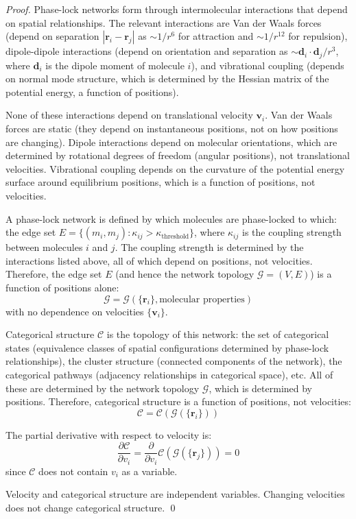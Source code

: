 \documentclass[12pt,a4paper]{article}
\theoremstyle{definition}
\theoremstyle{remark}
\newcommand{\phaselockgraph}{\mathcal{G}}
\begin{document}
\begin{proof}
Phase-lock networks form through intermolecular interactions that depend on spatial relationships. The relevant interactions are Van der Waals forces (depend on separation $|\mathbf{r}_i - \mathbf{r}_j|$ as $\sim 1/r^6$ for attraction and $\sim 1/r^{12}$ for repulsion), dipole-dipole interactions (depend on orientation and separation as $\sim \mathbf{d}_i \cdot \mathbf{d}_j / r^3$, where $\mathbf{d}_i$ is the dipole moment of molecule $i$), and vibrational coupling (depends on normal mode structure, which is determined by the Hessian matrix of the potential energy, a function of positions).

None of these interactions depend on translational velocity $\mathbf{v}_i$. Van der Waals forces are static (they depend on instantaneous positions, not on how positions are changing). Dipole interactions depend on molecular orientations, which are determined by rotational degrees of freedom (angular positions), not translational velocities. Vibrational coupling depends on the curvature of the potential energy surface around equilibrium positions, which is a function of positions, not velocities.

A phase-lock network is defined by which molecules are phase-locked to which: the edge set $E = \{(m_i, m_j) : \kappa_{ij} > \kappa_{\text{threshold}}\}$, where $\kappa_{ij}$ is the coupling strength between molecules $i$ and $j$. The coupling strength is determined by the interactions listed above, all of which depend on positions, not velocities. Therefore, the edge set $E$ (and hence the network topology $\phaselockgraph = (V, E)$) is a function of positions alone:
\begin{equation}
\phaselockgraph = \phaselockgraph(\{\mathbf{r}_i\}, \text{molecular properties})
\end{equation}
with no dependence on velocities $\{\mathbf{v}_i\}$.

Categorical structure $\mathcal{C}$ is the topology of this network: the set of categorical states (equivalence classes of spatial configurations determined by phase-lock relationships), the cluster structure (connected components of the network), the categorical pathways (adjacency relationships in categorical space), etc. All of these are determined by the network topology $\phaselockgraph$, which is determined by positions. Therefore, categorical structure is a function of positions, not velocities:
\begin{equation}
\mathcal{C} = \mathcal{C}(\phaselockgraph(\{\mathbf{r}_i\}))
\end{equation}

The partial derivative with respect to velocity is:
\begin{equation}
\frac{\partial \mathcal{C}}{\partial v_i} = \frac{\partial}{\partial v_i} \mathcal{C}(\phaselockgraph(\{\mathbf{r}_j\})) = 0
\end{equation}
since $\mathcal{C}$ does not contain $v_i$ as a variable.

Velocity and categorical structure are independent variables. Changing velocities does not change categorical structure. \qed
\end{proof}
\end{document}
